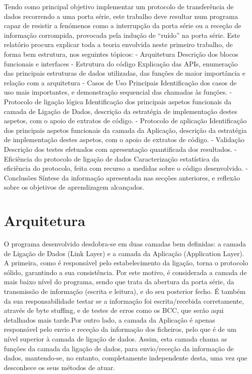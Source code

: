 \documentclass[article, a4paper, 11pt, oneside]{memoir}
\begin{document}
Tendo como principal objetivo implementar um protocolo de transferência de dados recorrendo a uma porta série, este trabalho deve resultar num programa capaz de resistir a fenómenos como a interrupção da porta série ou a receção de informação corrompida, provocada pela indução de “ruído” na porta série. Este relatório procura explicar toda a teoria envolvida neste primeiro trabalho, de forma bem estrutura, nos seguintes tópicos:
 - Arquitetura
	Descrição dos blocos funcionais e interfaces
	- Estrutura do código
	Explicação das APIs, enumeração das principais estruturas de dados utilizadas, das funções de maior importância e relação com a arquitetura
	- Casos de Uso Principais
	Identificação dos casos de uso mais importantes, e demonstração sequencial das chamadas às funções.
	- Protocolo de ligação lógica
	Identificação dos principais aspetos funcionais da camada de Ligação de Dados, descrição da estratégia de implementação destes aspetos, com o apoio de extratos de código.
	- Protocolo de aplicação
	Identificação dos principais aspetos funcionais da camada da Aplicação, descrição da estratégia de implementação destes aspetos, com o apoio de extratos de código.
- Validação
Descrição dos testes efetuados com apresentação quantificada dos resultados.
- Eficiência do protocolo de ligação de dados
Caracterização estatística da eficiência do protocolo, feita com recurso a medidas sobre o código desenvolvido.
- Conclusões
Síntese da informação apresentada nas secções anteriores, e reflexão sobre os objetivos de aprendizagem alcançados.

\newpage
\chapter[Arquitetura][Arquitetura]{Arquitetura} \label{\thechapter}

O programa desenvolvido desdobra-se em duas camadas bem definidas: a camada de Ligação de Dados (Link Layer) e a camada da Aplicação (Application Layer). 
A primeira, como é responsável pelo estabelecimento da ligação, torna o protocolo sólido, garantindo a sua consistência. Por este motivo, é considerada a camada de mais baixo nível do programa, sendo que trata da abertura da porta série, da transmissão de informação (escrita e leitura), e do seu posterior fecho. É também da sua responsabilidade testar se a informação foi escrita/recebida corretamente, através de byte stuffing, e de testes de erros como os BCC, que serão aqui detalhados mais tarde.Por outro lado, a camada da Aplicação é apenas responsável pelo envio e receção da informação dos ficheiros, pelo que é de um nível superior à camada de ligação de dados. Assim, esta camada chama as funções da camada da ligação de dados, para envio/receção da informação de dados, mantendo-se, no entanto, completamente independente desta, uma vez que desconhece os seus métodos de atuar.
\end{document}
